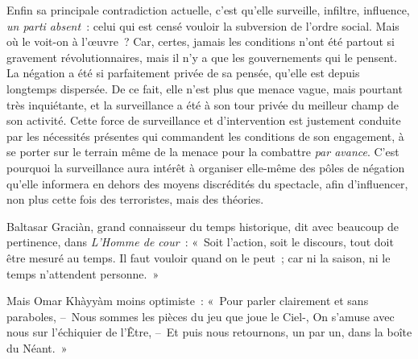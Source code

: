 \documentclass[french,twoside]{book} %
\def\bignobreak{\ifdim\lastskip<\bigskipamount
  \removelastskip\nopagebreak\bigskip\fi}
\newcommand{\labelblock}[1]{\bigbreak{\color{rubric}\noindent\textbf{#1}\par}\bignobreak}
\begin{document}
Enfin sa principale contradiction actuelle, c’est qu’elle surveille, infiltre, influence, \emph{un parti absent} : celui qui est censé vouloir la subversion de l’ordre social. Mais où le voit-on à l’œuvre ? Car, certes, jamais les conditions n’ont été partout si gravement révolutionnaires, mais il n’y a que les gouvernements qui le pensent. La négation a été si parfaitement privée de sa pensée, qu’elle est depuis longtemps dispersée. De ce fait, elle n’est plus que menace vague, mais pourtant très inquiétante, et la surveillance a été à son tour privée du meilleur champ de son activité. Cette force de surveillance et d’intervention est justement conduite par les nécessités présentes qui commandent les conditions de son engagement, à se porter sur le terrain même de la menace pour la combattre \emph{par avance}. C’est pourquoi la surveillance aura intérêt à organiser elle-même des pôles de négation qu’elle informera en dehors des moyens discrédités du spectacle, afin d’influencer, non plus cette fois des terroristes, mais des théories.\par

\labelblock{XXXI}

\noindent Baltasar Graciàn, grand connaisseur du temps historique, dit avec beaucoup de pertinence, dans \emph{L’Homme de cour} : « Soit l’action, soit le discours, tout doit être mesuré au temps. Il faut vouloir quand on le peut ; car ni la saison, ni le temps n’attendent personne. »\par
Mais Omar Khàyyàm moins optimiste : « Pour parler clairement et sans paraboles, – Nous sommes les pièces du jeu que joue le Ciel-, On s’amuse avec nous sur l’échiquier de l’Être, – Et puis nous retournons, un par un, dans la boîte du Néant. »\par

\labelblock{XXXII}
\end{document}
